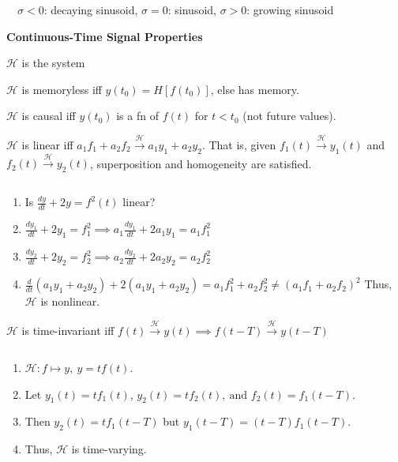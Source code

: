 \documentclass[twocolumn]{article}
\begin{document}
$\quad \sigma < 0$: decaying sinusoid, $\sigma = 0$: sinusoid, $\sigma > 0$: growing sinusoid

\vspace{-.5em}
\dotfill

\textbf{Continuous-Time Signal Properties}

\hfill
$\mathcal{H}$ is the system

$\mathcal{H}$ is memoryless iff $y(t_0) = H[f(t_0)]$, else has memory.

$\mathcal{H}$ is causal iff $y(t_0)$ is a fn of $f(t)$ for $t < t_0$ (not future values).

$\mathcal{H}$ is linear iff $a_1 f_1 + a_2 f_2 \xrightarrow{\mathcal{H}} a_1 y_1 + a_2 y_2$. That is, given $f_1(t) \xrightarrow{\mathcal{H}} y_1(t)$ and $f_2(t) \xrightarrow{\mathcal{H}} y_2(t)$, superposition and homogeneity are satisfied.

\vspace{-.5em} $\quad$
\begin{minipage}{0.9\columnwidth}
    \begin{enumerate}
        \item Is $\frac{dy}{dt} + 2y = f^2(t)$ linear?
        \item $\frac{dy_1}{dt} + 2y_1 = f_1^2 \implies a_1 \frac{dy_1}{dt} + 2 a_1 y_1 = a_1 f_1^2$
        \item $\frac{dy_2}{dt} + 2y_2 = f_2^2 \implies a_2 \frac{dy_2}{dt} + 2 a_2 y_2 = a_2 f_2^2$
        \item $\frac{d}{dt} (a_1 y_1 + a_2 y_2) + 2(a_1 y_1 + a_2 y_2) = a_1 f_1^2 + a_2 f_2^2 \neq (a_1 f_1 + a_2 f_2)^2$ \hfill Thus, $\mathcal{H}$ is nonlinear.
    \end{enumerate}
\end{minipage}

$\mathcal{H}$ is time-invariant iff $f(t) \xrightarrow{\mathcal{H}} y(t) \implies f(t-T) \xrightarrow{\mathcal{H}} y(t-T)$

\vspace{-.5em} $\quad$
\begin{minipage}{0.9\columnwidth}
    \begin{enumerate}
        \item $\mathcal{H}: f \mapsto y,\ y = tf(t)$.
        \item Let $y_1(t) = tf_1(t)$, $y_2(t) = tf_2(t),\ \text{and } f_2(t) = f_1(t-T)$.
        \item Then $y_2(t) = t f_1(t-T)$ but $y_1(t-T) = (t-T) f_1(t-T)$.
        \item Thus, $\mathcal{H}$ is time-varying.
    \end{enumerate}
\end{minipage}
\end{document}
